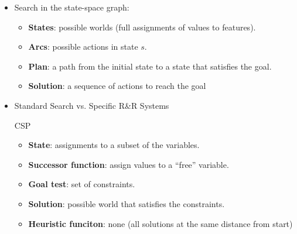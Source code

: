 \documentclass{article}
\begin{document}
\begin{itemize}
    \item Search in the state-space graph:
        \begin{itemize}
            \item \textbf{States}: possible worlds (full assignments of values to features).
            \item \textbf{Arcs}: possible actions in state $s$.
            \item \textbf{Plan}: a path from the initial state to a state that satisfies the goal.
            \item \textbf{Solution}: a sequence of actions to reach the goal
        \end{itemize}
    \item Standard Search vs. Specific R\&R Systems
        \begin{multicols}{2}
            CSP
            \begin{itemize}
                \item \textbf{State}: assignments to a subset of the variables.
                \item \textbf{Successor function}: assign values to a ``free'' variable.
                \item \textbf{Goal test}: set of constraints.
                \item \textbf{Solution}: possible world that satisfies the constraints.
                \item \textbf{Heuristic funciton}: none (all solutions at the same distance from start)
            \end{itemize}
            
            \columnbreak
            

\end{multicols}
\end{itemize}
\end{document}
